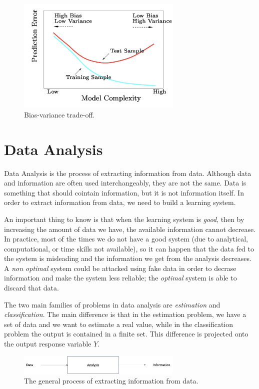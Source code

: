 \begin{figure}[H]
    \centering
    \includegraphics[width=0.7\textwidth]{./figures/intro/biasvariancetradeoff.png}
    \caption{Bias-variance trade-off.}
    \label{fig:biasvariancetradeoff}
\end{figure}
\newpage
\section*{Data Analysis}
Data Analysis is the process of extracting information from data. Although data and information are often used interchangeably, they are not the same. Data is something that should cointain information, but it is not information itself. In order to extract information from data, we need to build a learning system.

An important thing to know is that when the learning system is \textit{good}, then by increasing the amount of data we have, the available information cannot decrease. In practice, most of the times we do not have a good system (due to analytical, computational, or time skills not available), so it can happen that the data fed to the system is misleading and the information we get from the analysis decreases. A \textit{non optimal} system could be attacked using fake data in order to decrase information and make the system less reliable; the \textit{optimal} system is able to discard that data.

The two main families of problems in data analysis are \textit{estimation} and \textit{classification}. The main difference is that in the estimation problem,
we have a set of data and we want to estimate a real value, while in the classification problem the output is contained in a finite set. This difference is projected onto the output response variable $Y$.

\begin{figure}
    \centering
    \includegraphics[width=0.7\textwidth]{./figures/chapter_2/data2information.png}
    \caption{The general process of extracting information from data.}
    \label{fig:data2information}
\end{figure}

